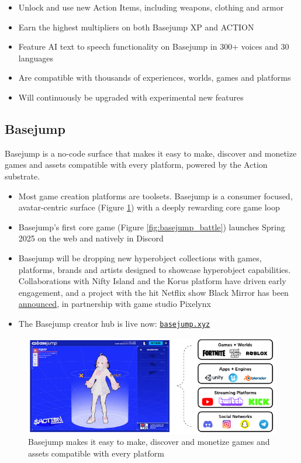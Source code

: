 \begin{itemize}
\item Unlock and use new Action Items, including weapons, clothing and armor
\item Earn the highest multipliers on both Basejump XP and ACTION
\item Feature AI text to speech functionality on Basejump in 300+ voices and 30 languages
\item Are compatible with thousands of experiences, worlds, games and platforms
\item Will continuously be upgraded with experimental new features
\end{itemize}


\subsection{Basejump}  

Basejump is a no-code surface that makes it easy to make, discover and monetize games and assets compatible with every platform, powered by the Action substrate.

\begin{itemize}
\item Most game creation platforms are toolsets. Basejump is a consumer focused, avatar-centric surface (Figure \ref{fig:basejump_platform}) with a deeply rewarding core game loop
\item Basejump's first core game (Figure \ref{fig:basejump_battle}) launches Spring 2025 on the web and natively in Discord
\item Basejump will be dropping new hyperobject collections with games, platforms, brands and artists designed to showcase hyperobject capabilities. Collaborations with Nifty Island and the Korus platform have driven early engagement, and a project with the hit Netflix show Black Mirror has been \href{https://x.com/blackmirror_xp/status/1786108170311541244}{announced}, in partnership with game studio Pixelynx
\item The Basejump creator hub is live now: \href{https://basejump.xyz/}{\texttt{basejump.xyz}}
\end{itemize}

\begin{figure}[t]
\centering
\includegraphics[width=\columnwidth]{images/image10.png}
\caption{Basejump makes it easy to make, discover and monetize games and assets compatible with every platform}
\label{fig:basejump_platform}
\end{figure}

